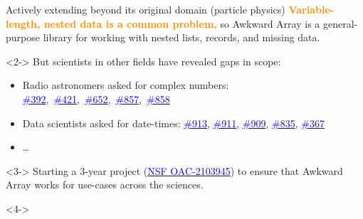 \documentclass[aspectratio=169]{beamer}
\begin{document}
\begin{frame}{Actively extending beyond its original domain (particle physics)}
\large
\vspace{0.3 cm}
\textcolor{darkorange}{\bf Variable-length, nested data is a common problem,} so Awkward Array is a general-purpose library for working with nested lists, records, and missing data.

\begin{uncoverenv}<2->
\vspace{0.3 cm}
But scientists in other fields have revealed gaps in scope:

\begin{itemize}
\item Radio astronomers asked for complex numbers: \mbox{\normalsize \href{https://github.com/scikit-hep/awkward-1.0/issues/392}{\textcolor{blue}{\#392}}, \href{https://github.com/scikit-hep/awkward-1.0/pull/421}{\textcolor{blue}{\#421}}, \href{https://github.com/scikit-hep/awkward-1.0/pull/652}{\textcolor{blue}{\#652}}, \href{https://github.com/scikit-hep/awkward-1.0/issues/857}{\textcolor{blue}{\#857}}, \href{https://github.com/scikit-hep/awkward-1.0/pull/858}{\textcolor{blue}{\#858}}\hspace{-0.5 cm}}
\item Data scientists asked for date-times: {\normalsize \href{https://github.com/scikit-hep/awkward-1.0/issues/913}{\textcolor{blue}{\#913}}, \href{https://github.com/scikit-hep/awkward-1.0/pull/911}{\textcolor{blue}{\#911}}, \href{https://github.com/scikit-hep/awkward-1.0/issues/909}{\textcolor{blue}{\#909}}, \href{https://github.com/scikit-hep/awkward-1.0/pull/835}{\textcolor{blue}{\#835}}, \href{https://github.com/scikit-hep/awkward-1.0/issues/367}{\textcolor{blue}{\#367}}}
\item \ldots
\end{itemize}
\end{uncoverenv}

\begin{uncoverenv}<3->
\vspace{0.3 cm}
Starting a 3-year project {\normalsize (\href{https://www.nsf.gov/awardsearch/showAward?AWD_ID=2103945&HistoricalAwards=false}{\textcolor{blue}{NSF OAC-2103945}})} to ensure that Awkward Array works for use-cases across the sciences.
\end{uncoverenv}

\begin{uncoverenv}<4->
\vspace{0.3 cm}
\setlength{\fboxsep}{0.3 cm}
\end{uncoverenv}


\end{frame}
\end{document}
